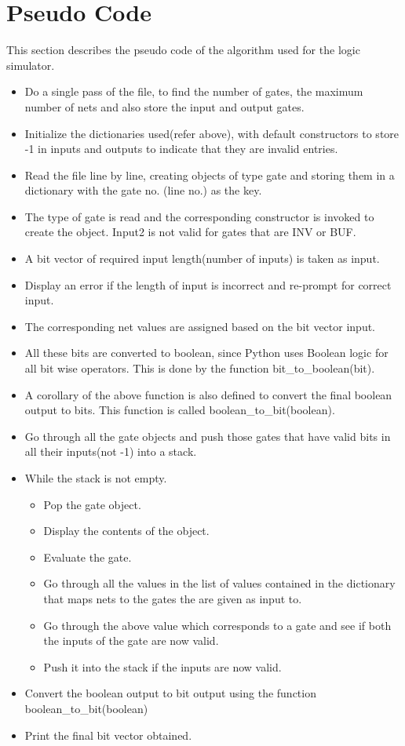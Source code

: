 \documentclass[paper=a4, fontsize=12pt]{scrartcl} %
\numberwithin{equation}{section} %
\numberwithin{figure}{section} %
\numberwithin{table}{section} %
\begin{document}
\newpage
\section{Pseudo Code}
This section describes the pseudo code of the algorithm used for the logic simulator. 
\begin{itemize}
\item Do a single pass of the file, to find the number of gates, the maximum number of nets and also store the input and output gates. 
\item Initialize the dictionaries used(refer above), with default  constructors to store -1 in inputs and outputs to indicate that they are invalid entries. 
\item  Read the file line by line, creating objects of type gate and storing them in a dictionary with the gate no. (line no.) as the key. 
\item The type of gate is read and the corresponding constructor is invoked to create the object. Input2 is not valid for gates that are INV or BUF. 
\item A bit vector of required input length(number of inputs) is taken as input. 
\item Display an error if the length of input is incorrect and re-prompt for correct input. 
\item The corresponding net values are assigned based on the bit vector input. 
\item All these bits are converted to boolean, since Python uses Boolean logic for all bit wise operators. This is done by the function bit\_to\_boolean(bit). 
\item A corollary of the above function is also defined to convert the final boolean output to bits. This function is called boolean\_to\_bit(boolean).
\item Go through all the gate objects and push those gates that have valid bits in all their inputs(not -1) into a stack.  
\item While the stack is not empty. 
\begin{itemize}
	\item Pop the gate object.
	\item Display the contents of the object. 
	\item Evaluate the gate. 
	\item Go through all the values in the list of values contained in the dictionary that maps nets to the gates the are given as input to. 
	\item Go through the above value which corresponds to a gate and see if both the inputs of the gate are now valid. 
	\item Push it into the stack if the inputs are now valid. 
\end{itemize}
\item Convert the boolean output to bit output using the function boolean\_to\_bit(boolean)
\item Print the final bit vector obtained. 
\end{itemize}
\end{document}
